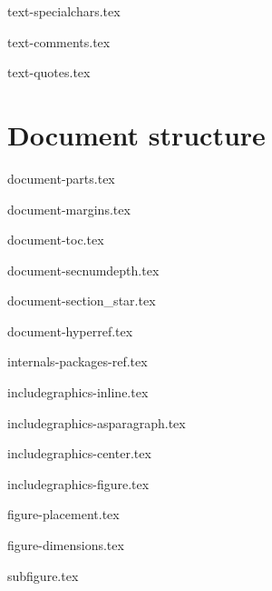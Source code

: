 \documentclass[allauthors]{../../cursuspresentatie}
\def\importslide#1#2{%
	{#2}
}
\begin{document}
\importslide{text}{text-specialchars.tex}

\importslide{text}{text-comments.tex}
\importslide{text}{text-quotes.tex}



\section{Document structure}

\importslide{document}{document-parts.tex}

\importslide{document}{document-margins.tex}


\importslide{document}{document-toc.tex}

\importslide{document}{document-secnumdepth.tex}

\importslide{document}{document-section_star.tex}

\importslide{document}{document-hyperref.tex}

\importslide{internals}{internals-packages-ref.tex}



\importslide{images}{includegraphics-inline.tex}
\importslide{images}{includegraphics-asparagraph.tex}
\importslide{images}{includegraphics-center.tex}
\importslide{images}{includegraphics-figure.tex}

\importslide{images}{figure-placement.tex}
\importslide{images}{figure-dimensions.tex}

\importslide{images}{subfigure.tex}

\end{document}
